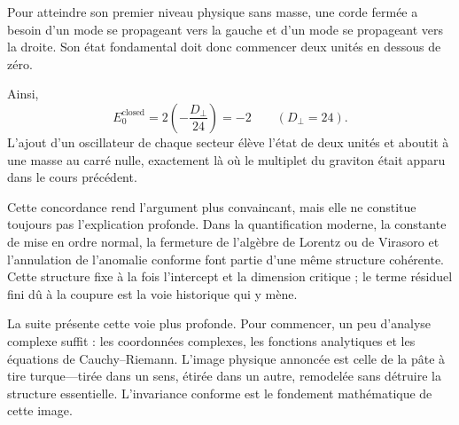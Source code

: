 Pour atteindre son premier niveau physique sans masse, une corde fermée a
besoin d’un mode se propageant vers la gauche et d’un mode se propageant
vers la droite. Son état fondamental doit donc commencer deux unités en
dessous de zéro.

\begin{classroomqa}
\end{classroomqa}

Ainsi,
\begin{equation}
  E_0^{\mathrm{closed}}
  =
  2\left(-\frac{D_\perp}{24}\right)
  =-2
  \qquad (D_\perp=24).
\end{equation}
L’ajout d’un oscillateur de chaque secteur élève l’état de deux unités et
aboutit à une masse au carré nulle, exactement là où le multiplet du graviton
était apparu dans le cours précédent.

Cette concordance rend l’argument plus convaincant, mais elle ne constitue toujours pas l’explication profonde. Dans la quantification moderne, la constante de mise en ordre normal, la fermeture de l’algèbre de Lorentz ou de Virasoro et l’annulation de l’anomalie conforme font partie d’une même structure cohérente. Cette structure fixe à la fois l’intercept et la dimension critique ; le terme résiduel fini dû à la coupure est la voie historique qui y mène.

La suite présente cette voie plus profonde. Pour commencer, un peu d’analyse complexe suffit : les coordonnées complexes, les fonctions analytiques et les équations de Cauchy--Riemann. L’image physique annoncée est celle de la pâte à tire turque---tirée dans un sens, étirée dans un autre, remodelée sans détruire la structure essentielle. L’invariance conforme est le fondement mathématique de cette image.